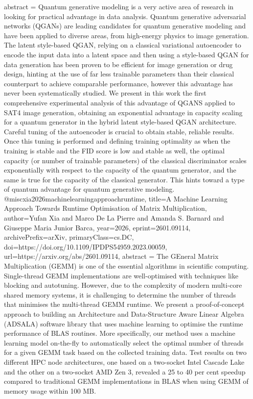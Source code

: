 {      abstract = {Quantum generative modeling is a very active area of research in looking for practical advantage in data analysis. Quantum generative adversarial networks (QGANs) are leading candidates for quantum generative modeling and have been applied to diverse areas, from high-energy physics to image generation. The latent style-based QGAN, relying on a classical variational autoencoder to encode the input data into a latent space and then using a style-based QGAN for data generation has been proven to be efficient for image generation or drug design, hinting at the use of far less trainable parameters than their classical counterpart to achieve comparable performance, however this advantage has never been systematically studied. We present in this work the first comprehensive experimental analysis of this advantage of QGANS applied to SAT4 image generation, obtaining an exponential advantage in capacity scaling for a quantum generator in the hybrid latent style-based QGAN architecture. Careful tuning of the autoencoder is crucial to obtain stable, reliable results. Once this tuning is performed and defining training optimality as when the training is stable and the FID score is low and stable as well, the optimal capacity (or number of trainable parameters) of the classical discriminator scales exponentially with respect to the capacity of the quantum generator, and the same is true for the capacity of the classical generator. This hints toward a type of quantum advantage for quantum generative modeling.}
}@misc{xia2026machinelearningapproachruntime,
      title={A Machine Learning Approach Towards Runtime Optimisation of Matrix Multiplication}, 
      author={Yufan Xia and Marco De La Pierre and Amanda S. Barnard and Giuseppe Maria Junior Barca},
      year={2026},
      eprint={2601.09114},
      archivePrefix={arXiv},
      primaryClass={cs.DC},
      doi={https://doi.org/10.1109/IPDPS54959.2023.00059},
      url={https://arxiv.org/abs/2601.09114},
      abstract = {The GEneral Matrix Multiplication (GEMM) is one of the essential algorithms in scientific computing. Single-thread GEMM implementations are well-optimised with techniques like blocking and autotuning. However, due to the complexity of modern multi-core shared memory systems, it is challenging to determine the number of threads that minimises the multi-thread GEMM runtime. We present a proof-of-concept approach to building an Architecture and Data-Structure Aware Linear Algebra (ADSALA) software library that uses machine learning to optimise the runtime performance of BLAS routines. More specifically, our method uses a machine learning model on-the-fly to automatically select the optimal number of threads for a given GEMM task based on the collected training data. Test results on two different HPC node architectures, one based on a two-socket Intel Cascade Lake and the other on a two-socket AMD Zen 3, revealed a 25 to 40 per cent speedup compared to traditional GEMM implementations in BLAS when using GEMM of memory usage within 100 MB.}
}
